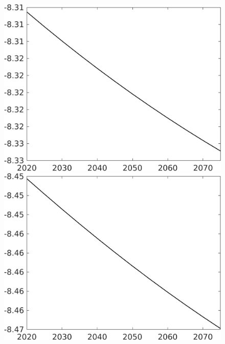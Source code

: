 \documentclass[12pt]{article}
\begin{document}
\begin{figure}[h!!]
\begin{minipage}[]{0.32\textwidth}
	\end{minipage}	
	\begin{minipage}[]{0.32\textwidth}
		\includegraphics[width=1\textwidth]{../../codding_model/own_basedOnFried/optimalPol_010922_revision/figures/all_13Sept22/CompTaul_LFBAUPer_Reg0_F_spillover0_nsk0_xgr1_knspil1_sep1_countec0_GovRev0_etaa0.79.png}
	\end{minipage}	
	\begin{minipage}[]{0.32\textwidth}
		\includegraphics[width=1\textwidth]{../../codding_model/own_basedOnFried/optimalPol_010922_revision/figures/all_13Sept22/CompTaul_LFBAUPer_Reg0_G_spillover0_nsk0_xgr1_knspil1_sep1_countec0_GovRev0_etaa0.79.png}

\end{minipage}
\end{figure}
\end{document}
